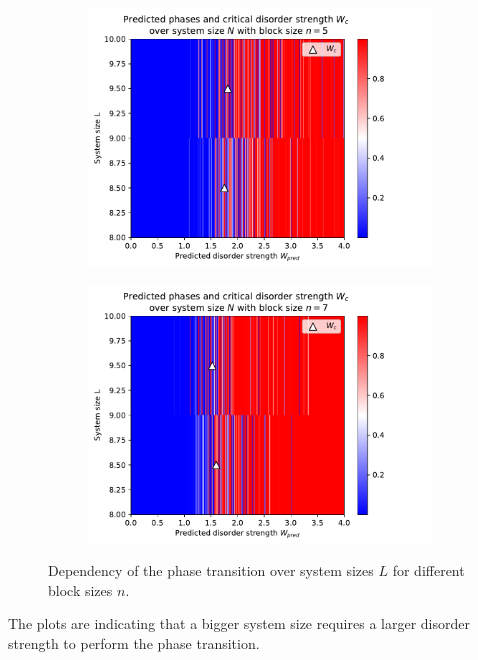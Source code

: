 \documentclass[reprint,amsmath,amssymb,aps,prb]{revtex4-2}
\begin{document}
\begin{center}
\begin{figure}[H]
\begin{subfigure}[c]{0.45\textwidth}
			\includegraphics[width=\textwidth]{../results/Wc/n5_Wc_N_dependency.pdf}
		\end{subfigure}
		\begin{subfigure}[c]{0.45\textwidth}
			\includegraphics[width=\textwidth]{../results/Wc/n7_Wc_N_dependency.pdf}
		\end{subfigure}
		\caption{Dependency of the phase transition over system sizes $L$ for different block sizes $n$.}
		\label{fig:wcextract}
	\end{figure}
\end{center}
\twocolumngrid


The plots are indicating that a bigger system size requires a larger disorder strength to perform the phase transition.
\end{document}
